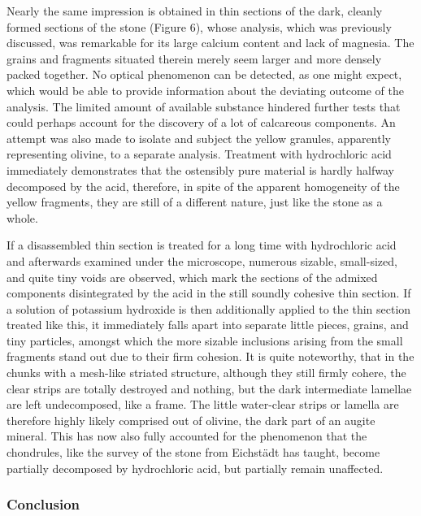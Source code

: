 \documentclass[a4paper, 12pt, oneside]{article}
\begin{document}
Nearly the same impression is obtained in thin sections of the dark, cleanly formed sections of the stone (Figure 6), whose analysis, which was previously discussed, was remarkable for its large calcium content and lack of magnesia. The grains and fragments situated therein merely seem larger and more densely packed together. No optical phenomenon can be detected, as one might expect, which would be able to provide information about the deviating outcome of the analysis. The limited amount of available substance hindered further tests that could perhaps account for the discovery of a lot of calcareous components. An attempt was also made to isolate and subject the yellow granules, apparently representing olivine, to a separate analysis. Treatment with hydrochloric acid immediately demonstrates that the ostensibly pure material is hardly halfway decomposed by the acid, therefore, in spite of the apparent homogeneity of the yellow fragments, they are still of a different nature, just like the stone as a whole.

If a disassembled thin section is treated for a long time with hydrochloric acid and afterwards examined under the microscope, numerous sizable, small-sized, and quite tiny voids are observed, which mark the sections of the admixed components disintegrated by the acid in the still soundly cohesive thin section. If a solution of potassium hydroxide is then additionally applied to the thin section treated like this, it immediately falls apart into separate little pieces, grains, and tiny particles, amongst which the more sizable inclusions arising from the small fragments stand out due to their firm cohesion. It is quite noteworthy, that in the chunks with a mesh-like striated structure, although they still firmly cohere, the clear strips are totally destroyed and nothing, but the dark intermediate lamellae are left undecomposed, like a frame. The little water-clear strips or lamella are therefore highly likely comprised out of olivine, the dark part of an augite mineral. This has now also fully accounted for the phenomenon that the chondrules, like the survey of the stone from Eichstädt has taught, become partially decomposed by hydrochloric acid, but partially remain unaffected.
\clearpage

\subsubsection{Conclusion}
\end{document}
